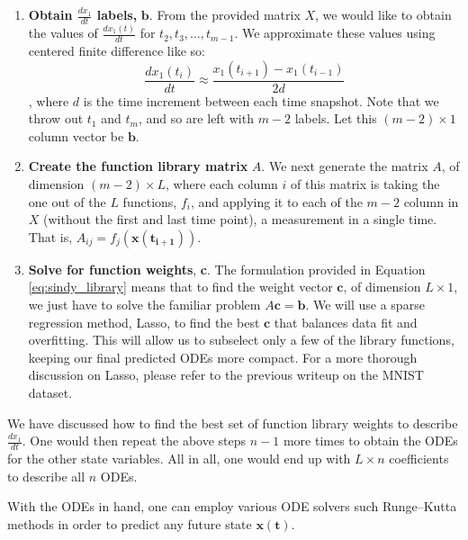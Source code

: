 \documentclass[letterpaper, 10 pt, conference]{ieeeconf}  %
\begin{document}
\begin{enumerate}

\item{\textbf{Obtain $\frac{dx_1}{dt}$ labels,} $\bm{b}$.}
From the provided matrix $X$, we would like to obtain the values of $\frac{dx_1(t)}{dt}$ for $t_2, t_3, ..., t_{m-1}$. We approximate these values using centered finite difference like so:
\begin{equation}
\frac{dx_1(t_i)}{dt} \approx \frac{x_1(t_{i+1}) - x_1(t_{i-1})}{2d}
\end{equation}
, where $d$ is the time increment between each time snapshot. Note that we throw out $t_1$ and $t_m$, and so are left with $m-2$ labels.
Let this $(m-2) \times 1$ column vector be $\bm{b}$.

\item{\textbf{Create the function library matrix} $A$}.
We next generate the matrix $A$, of dimension $(m-2) \times L$, where each column $i$ of this matrix is taking the one out of the $L$ functions, $f_i$, and applying it to each of the $m-2$ column in $X$ (without the first and last time point), a measurement in a single time. That is, $A_{ij} = f_j(\bm{x(t_{i+1})})$.

\item{\textbf{Solve for function weights}, \textbf{c}}.
The formulation provided in Equation \ref{eq:sindy_library} means that to find the weight vector $\bm{c}$, of dimension $L \times 1$, we just have to solve the familiar problem $A\bm{c} = \bm{b}$. We will use a sparse regression method, Lasso\cite{tibshirani1994lasso}, to find the best $\bm{c}$ that balances data fit and overfitting. This will allow us to subselect only a few of the library functions, keeping our final predicted ODEs more compact. For a more thorough discussion on Lasso, please refer to the previous writeup on the MNIST dataset.
\end{enumerate}

We have discussed how to find the best set of function library weights to describe $\frac{dx_1}{dt}$. One would then repeat the above steps $n-1$ more times to obtain the ODEs for the other state variables. All in all, one would end up with $L \times n$ coefficients to describe all $n$ ODEs.

With the ODEs in hand, one can employ various ODE solvers such Runge–Kutta methods in order to predict any future state $\bm{x(t)}$. 
\end{document}
